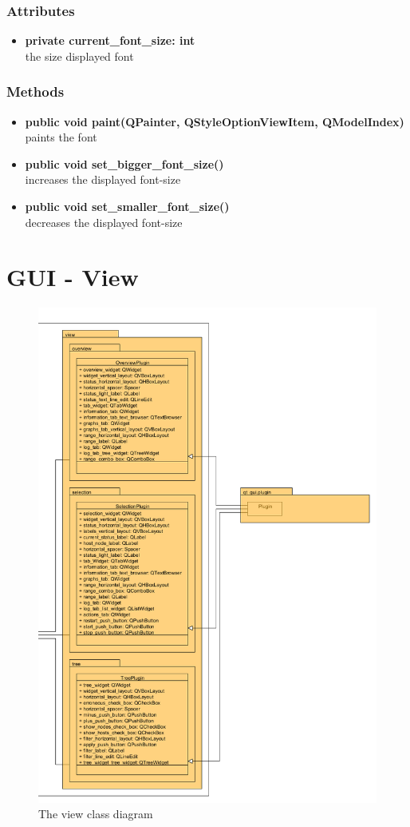 \subsubsection{Attributes}
\begin{itemize}
  \item \textbf{private current\_font\_size: int}\\
  the size displayed font
\end{itemize}
\subsubsection{Methods}
\begin{itemize}
  \item \textbf{public void paint(QPainter, QStyleOptionViewItem,
  QModelIndex)}\\
  paints the font
  \item \textbf{public void set\_bigger\_font\_size()}\\
  increases the displayed font-size
  \item \textbf{public void set\_smaller\_font\_size()}\\
  decreases the displayed font-size
\end{itemize}

\newpage
\section{GUI - View}
\begin{figure}[!ht]
\begin{center}
\includegraphics[width=0.8\linewidth]{./bilder/view.png}
\caption{The view class diagram}
\end{center}
\end{figure}

